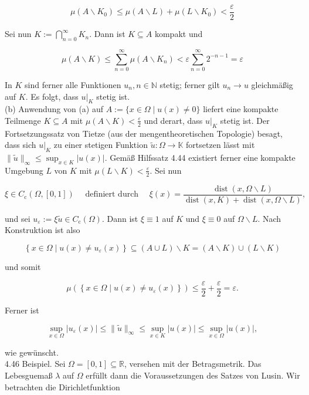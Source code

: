 \documentclass[10pt, letterpaper]{article}
\begin{document}
$$
\mu\left(A \backslash K_{0}\right) \leq \mu(A \backslash L)+\mu\left(L \backslash K_{0}\right)<\frac{\varepsilon}{2}
$$

Sei nun $K:=\bigcap_{n=0}^{\infty} K_{n}$. Dann ist $K \subseteq A$ kompakt und

$$
\mu(A \backslash K) \leq \sum_{n=0}^{\infty} \mu\left(A \backslash K_{n}\right)<\varepsilon \sum_{n=0}^{\infty} 2^{-n-1}=\varepsilon
$$

In $K$ sind ferner alle Funktionen $u_{n}, n \in \mathbb{N}$ stetig; ferner gilt $u_{n} \rightarrow u$ gleichmäßig auf $K$. Es folgt, dass $\left.u\right|_{K}$ stetig ist.\\
(b) Anwendung von (a) auf $A:=\{x \in \Omega \mid u(x) \neq 0\}$ liefert eine kompakte Teilmenge $K \subseteq A$ mit $\mu(A \backslash K)<\frac{\varepsilon}{2}$ und derart, dass $\left.u\right|_{K}$ stetig ist. Der Fortsetzungssatz von Tietze (aus der mengentheoretischen Topologie) besagt, dass sich $\left.u\right|_{K}$ zu einer stetigen Funktion $\tilde{u}: \Omega \rightarrow \mathbb{K}$ fortsetzen lässt mit $\|\tilde{u}\|_{\infty} \leq \sup _{x \in K}|u(x)|$. Gemäß Hilfssatz 4.44 existiert ferner eine kompakte Umgebung $L$ von $K$ mit $\mu(L \backslash K)<\frac{\varepsilon}{2}$. Sei nun

$$
\xi \in C_{\mathrm{c}}(\Omega,[0,1]) \quad \text { definiert durch } \quad \xi(x)=\frac{\operatorname{dist}(x, \Omega \backslash L)}{\operatorname{dist}(x, K)+\operatorname{dist}(x, \Omega \backslash L)},
$$

und sei $u_{\varepsilon}:=\xi \tilde{u} \in C_{\mathrm{c}}(\Omega)$. Dann ist $\xi \equiv 1$ auf $K$ und $\xi \equiv 0$ auf $\Omega \backslash L$. Nach Konstruktion ist also

$$
\left\{x \in \Omega \mid u(x) \neq u_{\varepsilon}(x)\right\} \subseteq(A \cup L) \backslash K=(A \backslash K) \cup(L \backslash K)
$$

und somit

$$
\mu\left(\left\{x \in \Omega \mid u(x) \neq u_{\varepsilon}(x)\right\}\right) \leq \frac{\varepsilon}{2}+\frac{\varepsilon}{2}=\varepsilon .
$$

Ferner ist

$$
\sup _{x \in \Omega}\left|u_{\varepsilon}(x)\right| \leq\|\tilde{u}\|_{\infty} \leq \sup _{x \in K}|u(x)| \leq \sup _{x \in \Omega}|u(x)|,
$$

wie gewünscht.\\
4.46 Beispiel. Sei $\Omega=[0,1] \subseteq \mathbb{R}$, versehen mit der Betragsmetrik. Das Lebesguemaß $\lambda$ auf $\Omega$ erfüllt dann die Voraussetzungen des Satzes von Lusin. Wir betrachten die Dirichletfunktion
\end{document}

